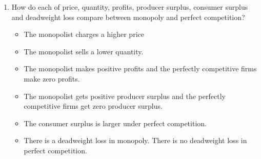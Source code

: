 \documentclass[12pt]{article}
\newcounter{question}[section]
\newenvironment{subquestions}{
  \begin{enumerate}[label=(\roman*)]}{\end{enumerate}}
\begin{document}
\begin{subquestions}
  \item How do each of price, quantity, profits, producer surplus, consumer
    surplus and deadweight loss compare between monopoly and perfect competition?

    \textcolor{solution-color}{
      \begin{itemize}
        \item  The monopolist charges a higher price
        \item The monopolist sells a lower quantity.
        \item The monopolist makes positive profits and the perfectly
          competitive firms make zero profits.
        \item The monopolist gets positive producer surplus and the perfectly
          competitive firms get zero producer surplus.
        \item The consumer surplus is larger under perfect competition.
        \item There is a deadweight loss in monopoly. There is no deadweight
          loss in perfect competition.
      \end{itemize}
    }
\end{subquestions}
\end{document}
